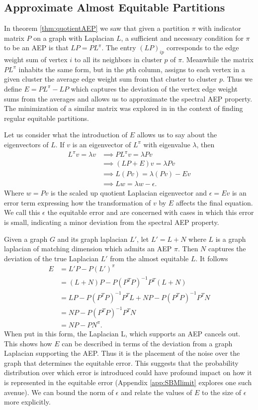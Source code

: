 \documentclass[%
 aip,
 amsmath,amssymb,
preprint,
reprint, onecolumn %
]{revtex4-1}
\begin{document}
\subsection{Approximate Almost Equitable Partitions}


In theorem \ref{thm:quotientAEP} we saw that given a partition $\pi$ with indicator matrix $P$ on a graph with Laplacian $L$, a sufficient and necessary condition for $\pi$ to be an AEP is that $LP=PL^\pi$. The entry $(LP)_{ip}$ corresponds to the edge weight sum of vertex $i$ to all its neighbors in cluster $p$ of $\pi$. Meanwhile the matrix $PL^\pi$ inhabits the same form, but in the $p$th column, assigns to each vertex in a given cluster the average edge weight sum from that cluster to cluster $p$. Thus we define $E = PL^\pi - LP$ which captures the deviation of the vertex edge weight sums from the averages and allows us to approximate the spectral AEP property. The minimization of a similar matrix was explored in\cite{scholkemper_optimization-based_nodate} in the context of finding regular equitable partitions. 

Let us consider what the introduction of $E$ allows us to say about the eigenvectors of $L$. If $v$ is an eigenvector of $L^\pi$ with eigenvalue $\lambda$, then
\begin{align*}
    L^\pi v = \lambda v &\implies PL^\pi v = \lambda P v\\
    &\implies (LP+E)v=\lambda Pv\\
    &\implies L(Pv) = \lambda(Pv) - Ev\\
    &\implies Lw = \lambda w - \epsilon.
\end{align*}
Where $w=Pv$ is the scaled up quotient Laplacian eigenvector and $\epsilon = Ev$ is an error term expressing how the transformation of $v$ by $E$ affects the final equation. We call this $\epsilon$ the equitable error and are concerned with cases in which this error is small, indicating a minor deviation from the spectral AEP property. 

Given a graph $G$ and its graph laplacian $L'$, let $L'=L+N$ where $L$ is a graph laplacian of matching dimension which admits an AEP $\pi$. Then $N$ captures the deviation of the true Laplacian $L'$ from the almost equitable $L$. It follows 
\begin{align*}
    E &= L'P - P (L')^\pi  \\
    &= (L+N)P - P(P^T P)^{-1}P^T(L+N)\\
    &=LP - P(P^T P)^{-1}P^TL + NP - P(P^T P)^{-1}P^T N\\
    &=NP - P(P^T P)^{-1}P^TN\\
    &=NP - P N^\pi.
\end{align*}
When put in this form, the Laplacian L, which supports an AEP cancels out. This shows how $E$ can be described in terms of the deviation from a graph Laplacian supporting the AEP. Thus it is the placement of the noise over the graph that determines the equitable error. This suggests that the probability distribution over which error is introduced could have profound impact on how it is represented in the equitable error (Appendix \ref{app:SBMlimit} explores one such avenue). We can bound the norm of $\epsilon$ and relate the values of $E$ to the size of $\epsilon$ more explicitly.
\end{document}
